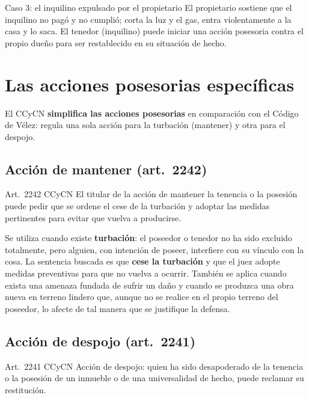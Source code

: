 \documentclass[12pt,oneside]{book}
\begin{document}
\begin{ejemplo}{Caso 3: el inquilino expulsado por el propietario}
El propietario sostiene que el inquilino no pagó y no cumplió; corta la luz y el gas, entra violentamente a la casa y lo saca. El tenedor (inquilino) puede iniciar una acción posesoria contra el propio dueño para ser restablecido en su situación de hecho.
\end{ejemplo}

\section{Las acciones posesorias específicas}

El CCyCN \textbf{simplifica las acciones posesorias} en comparación con el Código de Vélez: regula una sola acción para la turbación (mantener) y otra para el despojo.

\subsection{Acción de mantener (art.~2242)}

\begin{regla}{Art.~2242 CCyCN}
El titular de la acción de mantener la tenencia o la posesión puede pedir que se ordene el cese de la turbación y adoptar las medidas pertinentes para evitar que vuelva a producirse.
\end{regla}

Se utiliza cuando existe \textbf{turbación}: el poseedor o tenedor no ha sido excluido totalmente, pero alguien, con intención de poseer, interfiere con su vínculo con la cosa. La sentencia buscada es que \textbf{cese la turbación} y que el juez adopte medidas preventivas para que no vuelva a ocurrir. También se aplica cuando exista una amenaza fundada de sufrir un daño y cuando se produzca una obra nueva en terreno lindero que, aunque no se realice en el propio terreno del poseedor, lo afecte de tal manera que se justifique la defensa.

\subsection{Acción de despojo (art.~2241)}

\begin{regla}{Art.~2241 CCyCN}
Acción de despojo: quien ha sido desapoderado de la tenencia o la posesión de un inmueble o de una universalidad de hecho, puede reclamar su restitución.
\end{regla}
\end{document}

